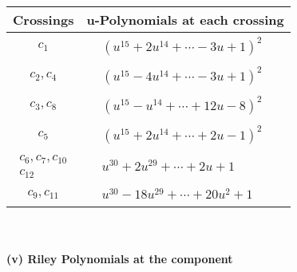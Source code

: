 \documentclass[1p]{elsarticle_modified}
\theoremstyle{definition}
\begin{document}
\begin{tabular}{m{50pt}|m{274pt}}
Crossings & \hspace{64pt}u-Polynomials at each crossing \\
\hline $$\begin{aligned}c_{1}\end{aligned}$$&$\begin{aligned}
&(u^{15}+2 u^{14}+\cdots-3 u+1)^{2}
\end{aligned}$\\
\hline $$\begin{aligned}c_{2},c_{4}\end{aligned}$$&$\begin{aligned}
&(u^{15}-4 u^{14}+\cdots-3 u+1)^{2}
\end{aligned}$\\
\hline $$\begin{aligned}c_{3},c_{8}\end{aligned}$$&$\begin{aligned}
&(u^{15}- u^{14}+\cdots+12 u-8)^{2}
\end{aligned}$\\
\hline $$\begin{aligned}c_{5}\end{aligned}$$&$\begin{aligned}
&(u^{15}+2 u^{14}+\cdots+2 u-1)^{2}
\end{aligned}$\\
\hline $$\begin{aligned}c_{6},c_{7},c_{10}\\c_{12}\end{aligned}$$&$\begin{aligned}
&u^{30}+2 u^{29}+\cdots+2 u+1
\end{aligned}$\\
\hline $$\begin{aligned}c_{9},c_{11}\end{aligned}$$&$\begin{aligned}
&u^{30}-18 u^{29}+\cdots+20 u^2+1
\end{aligned}$\\
\hline
\end{tabular}\\~\\
\newpage\renewcommand{\arraystretch}{1}
\flushleft \textbf{(v) Riley Polynomials at the component}\newline \\
\end{document}
